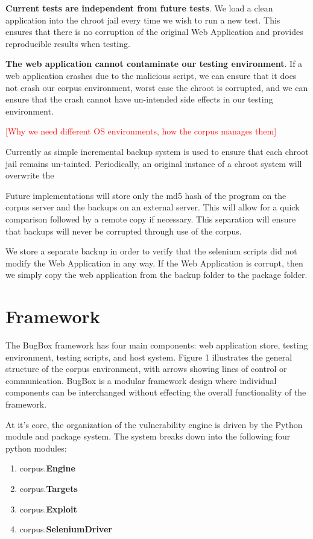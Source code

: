 \documentclass[letterpaper,twocolumn,10pt]{article}
\begin{document}
{\bf Current tests are independent from future tests}.  We load a clean application into the chroot jail every time we wish to run a new test.  This ensures that there is no corruption of the original Web Application and provides reproducible results when testing.

{\bf The web application cannot contaminate our testing environment}.  If a web application crashes due to the malicious script, we can ensure that it does not crash our corpus environment, worst case the chroot is corrupted, and we can ensure that the crash cannot have un-intended side effects in our testing environment.  

\textcolor{red}{[Why we need different OS environments, how the corpus manages them]}


Currently as simple incremental backup system is used to ensure that each chroot jail remains un-tainted. Periodically, an original instance of a chroot system will overwrite the 

Future implementations will store only the md5 hash of the program on the corpus server and the backups on an external server.  This will allow for a quick comparison followed by a remote copy if necessary.  This separation will ensure that backups will never be corrupted through use of the corpus.  

We store a separate backup in order to verify that the selenium scripts did not modify the Web Application in any way.  If the Web Application is corrupt, then we simply copy the web application from the backup folder to the package folder.  

\section{Framework}

The BugBox framework has four main components: web application store, testing environment, testing scripts, and host system. Figure 1 illustrates the general structure of the corpus environment, with arrows showing lines of control or communication.  BugBox is a modular framework design where individual components can be interchanged without effecting the overall functionality of the framework.\par
At it's core, the organization of the vulnerability engine is driven by the Python module and package system. The system breaks down into the following four python modules:
\begin{center}
 \begin{enumerate}
   \item corpus.{\bf Engine}\\
   \item corpus.{\bf Targets}\\
   \item corpus.{\bf Exploit}\\
   \item corpus.{\bf SeleniumDriver}\\
 \end{enumerate}
\end{center}
   
\end{document}
